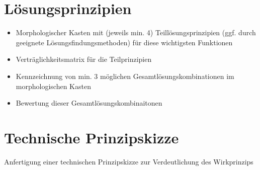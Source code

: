 \section{Lösungsprinzipien}

\begin{itemize}
	\item Morphologischer Kasten mit (jeweils min. 4) Teillösungsprinzipien (ggf. durch geeignete Lösungsfindungsmethoden) für diese wichtigsten Funktionen
	\item Verträglichkeitsmatrix für die Teilprinzipien
	\item Kennzeichnung von min. 3 möglichen Gesamtlösungskombinationen im morphologischen Kasten
	\item Bewertung dieser Gesamtlösungskombinaitonen
\end{itemize}

\section{Technische Prinzipskizze}

Anfertigung einer technischen Prinzipskizze zur Verdeutlichung des Wirkprinzips